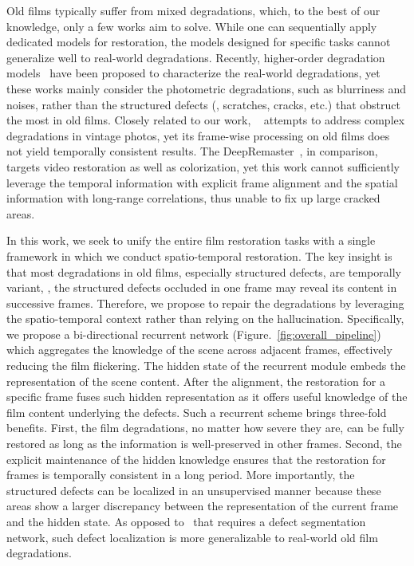 \documentclass[10pt,twocolumn,letterpaper]{article}
\begin{document}
	Old films typically suffer from mixed degradations, which, to the best of our knowledge, only a few works aim to solve. While one can sequentially apply dedicated models for restoration, the models designed for specific tasks cannot generalize well to real-world degradations. Recently, higher-order degradation models~\cite{zhang2021designing,wang2021real} have been proposed to characterize the real-world degradations, yet these works mainly consider the photometric degradations, such as blurriness and noises, rather than the structured defects (\eg, scratches, cracks, etc.) that obstruct the most in old films. Closely related to our work, ~\cite{wan2020bringing} attempts to address complex degradations in vintage photos, yet its frame-wise processing on old films does not yield temporally consistent results. The DeepRemaster~\cite{iizuka2019deepremaster}, in comparison, targets video restoration as well as colorization, yet this work cannot sufficiently leverage the temporal information with explicit frame alignment and the spatial information with long-range correlations, thus unable to fix up large cracked areas.
	
	In this work, we seek to unify the entire film restoration tasks with a single framework in which we conduct spatio-temporal restoration. The key insight is that most degradations in old films, especially structured defects, are temporally variant, \ie, the structured defects occluded in one frame may reveal its content in successive frames. Therefore, we propose to repair the degradations by leveraging the spatio-temporal context rather than relying on the hallucination. Specifically, we propose a bi-directional recurrent network (Figure.~\ref{fig:overall_pipeline}) which aggregates the knowledge of the scene across adjacent frames, effectively reducing the film flickering. The hidden state of the recurrent module embeds the representation of the scene content. After the alignment, the restoration for a specific frame fuses such hidden representation as it offers useful knowledge of the film content underlying the defects. Such a recurrent scheme brings three-fold benefits. First, the film degradations, no matter how severe they are, can be fully restored as long as the information is well-preserved in other frames. Second, the explicit maintenance of the hidden knowledge ensures that the restoration for frames is temporally consistent in a long period. More importantly, the structured defects can be localized in an unsupervised manner because these areas show a larger discrepancy between the representation of the current frame and the hidden state. As opposed to~\cite{wan2020bringing} that requires a defect segmentation network, such defect localization is more generalizable to real-world old film degradations.
	
\end{document}
